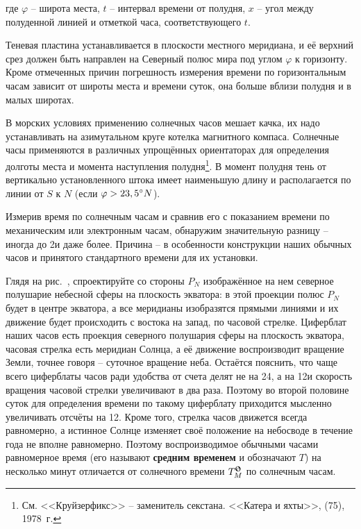 где $\varphi$ \--- широта места, $t$ \--- интервал времени от полудня,
$x$ \--- угол между полуденной линией и отметкой часа,
соответствующего $t$.

Теневая пластина устанавливается в плоскости местного меридиана, и её
верхний срез должен быть направлен на Северный полюс мира под углом
$\varphi$ к горизонту. Кроме отмеченных причин погрешность измерения
времени по горизонтальным часам зависит от широты места и времени
суток, она больше вблизи полудня и в малых широтах.

В морских условиях применению солнечных часов мешает качка, их надо
устанавливать на азимутальном круге котелка магнитного
компаса. Солнечные часы применяются в различных упрощённых
ориентаторах для определения долготы места и момента наступления
полудня\footnote{См. <<Круйзерфикс>>\label{cruiserfix} \--- заменитель
  секстана. <<Катера и яхты>>,  (75), 1978~г.}. В момент полудня
тень от вертикально установленного штока имеет наименьшую длину и
располагается по линии от $S$ к $N$ (если $\varphi > 23,5^\circ N$).

Измерив время по солнечным часам и сравнив его с показанием времени по
механическим или электронным часам, обнаружим значительную разницу
\--- иногда до 2\thr и даже более. Причина \--- в особенности
конструкции наших обычных часов и принятого стандартного времени для
их установки.

Глядя на рис.~, спроектируйте со стороны $P_N$ изображённое на
нем северное полушарие небесной сферы на плоскость экватора: в этой
проекции полюс $P_N$ будет в центре экватора, а все меридианы
изобразятся прямыми линиями и их движение будет происходить с востока
на запад, по часовой стрелке. Циферблат наших часов есть проекция
северного полушария сферы на плоскость экватора, часовая стрелка есть
меридиан Солнца, а её движение воспроизводит вращение Земли, точнее
говоря \--- суточное вращение неба. Остаётся пояснить, что чаще всего
циферблаты часов ради удобства от счета делят не на 24\thr, а на
12\thr и скорость вращения часовой стрелки увеличивают в два
раза. Поэтому во второй половине суток для определения времени по
такому циферблату приходится мысленно увеличивать отсчёты на
12\thr. Кроме того, стрелка часов движется всегда равномерно, а
истинное Солнце изменяет своё положение на небосводе в течение года не
вполне равномерно. Поэтому воспроизводимое обычными часами равномерное
время (его называют \textbf{средним временем} и обозначают $T$) на
несколько минут отличается от солнечного времени $\TSun_M$ по
солнечным часам.


